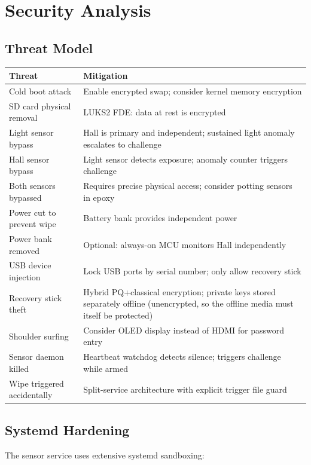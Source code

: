 \documentclass[11pt,letterpaper]{article}
\begin{document}
\section{Security Analysis}

\subsection{Threat Model}

\begin{xltabular}{\textwidth}{L{4.4cm} Y}
\toprule
\textbf{Threat} & \textbf{Mitigation} \\
\midrule
\endhead
Cold boot attack & Enable encrypted swap; consider kernel memory encryption \\
SD card physical removal & LUKS2 FDE: data at rest is encrypted \\
Light sensor bypass & Hall is primary and independent; sustained light anomaly escalates to challenge \\
Hall sensor bypass & Light sensor detects exposure; anomaly counter triggers challenge \\
Both sensors bypassed & Requires precise physical access; consider potting sensors in epoxy \\
Power cut to prevent wipe & Battery bank provides independent power \\
Power bank removed & Optional: always-on MCU monitors Hall independently \\
USB device injection & Lock USB ports by serial number; only allow recovery stick \\
Recovery stick theft & Hybrid PQ+classical encryption; private keys stored separately offline (unencrypted, so the offline media must itself be protected) \\
Shoulder surfing & Consider OLED display instead of HDMI for password entry \\
Sensor daemon killed & Heartbeat watchdog detects silence; triggers challenge while armed \\
Wipe triggered accidentally & Split-service architecture with explicit trigger file guard \\*
\bottomrule
\end{xltabular}

\subsection{Systemd Hardening}

The sensor service uses extensive systemd sandboxing:
\end{document}

